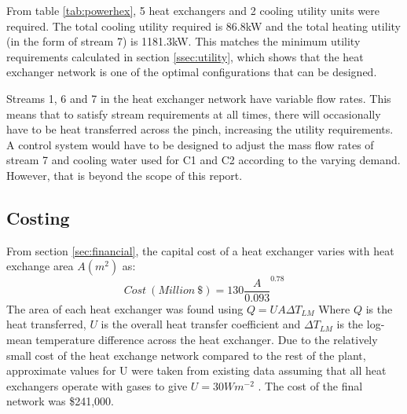 From table \ref{tab:powerhex}, 5 heat exchangers and 2 cooling utility units were required. The total cooling utility required is 86.8kW and the total heating utility (in the form of stream 7) is 1181.3kW. This matches the minimum utility requirements calculated in section \ref{ssec:utility}, which shows that the heat exchanger network is one of the optimal configurations that can be designed.

Streams 1, 6 and 7 in the heat exchanger network have variable flow rates. This means that to satisfy stream requirements at all times, there will occasionally have to be heat transferred across the pinch, increasing the utility requirements. A control system would have to be designed to adjust the mass flow rates of stream 7 and cooling water used for C1 and C2 according to the varying demand. However, that is beyond the scope of this report.

\subsection{Costing}
From section \ref{sec:financial}, the capital cost of a heat exchanger varies with heat exchange area $A (m^2)$ as:
\begin{equation} %
Cost \ (Million\ \$) = 130 \frac{A}{0.093}^{0.78}
\end{equation}
The area of each heat exchanger was found using $Q = UA\Delta T_{LM}$
Where $Q$ is the heat transferred, $U$ is the overall heat transfer coefficient and $\Delta T_{LM}$ is the log-mean temperature difference across the heat exchanger. Due to the relatively small cost of the heat exchange network compared to the rest of the plant, approximate values for U were taken from existing data assuming that all heat exchangers operate with gases to give $U=30Wm^{-2}$ \cite{hexcoeff}. The cost of the final network was \$241,000. 


%

%